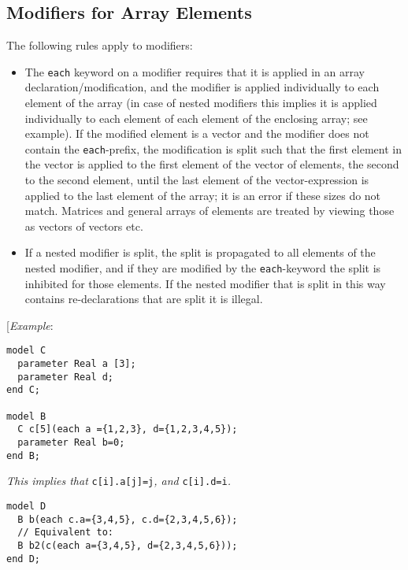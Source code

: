 \subsection{Modifiers for Array Elements}

The following rules apply to modifiers:

\begin{itemize}
\item
  The \lstinline[basicstyle=\ttfamily]!each! keyword on a modifier requires that it is applied in an array
  declaration/modification, and the modifier is applied individually to
  each element of the array (in case of nested modifiers this implies it
  is applied individually to each element of each element of the
  enclosing array; see example). If the modified element is a vector and
  the modifier does not contain the \lstinline[basicstyle=\ttfamily]!each!-prefix, the modification is
  split such that the first element in the vector is applied to the
  first element of the vector of elements, the second to the second
  element, until the last element of the vector-expression is applied to
  the last element of the array; it is an error if these sizes do not
  match. Matrices and general arrays of elements are treated by viewing
  those as vectors of vectors etc.
\item
  If a nested modifier is split, the split is propagated to all elements
  of the nested modifier, and if they are modified by the \lstinline[basicstyle=\ttfamily]!each!-keyword
  the split is inhibited for those elements. If the nested modifier that
  is split in this way contains re-declarations that are split it is
  illegal.
\end{itemize}

{[}\emph{Example}:
\begin{lstlisting}[language=modelica]
model C
  parameter Real a [3];
  parameter Real d;
end C;

model B
  C c[5](each a ={1,2,3}, d={1,2,3,4,5});
  parameter Real b=0;
end B;
\end{lstlisting}

\emph{This implies that} \lstinline[basicstyle=\ttfamily]!c[i].a[j]=j!\emph{, and}
\lstinline[basicstyle=\ttfamily]!c[i].d=i!\emph{.}
\begin{lstlisting}[language=modelica]
model D
  B b(each c.a={3,4,5}, c.d={2,3,4,5,6});
  // Equivalent to:
  B b2(c(each a={3,4,5}, d={2,3,4,5,6}));
end D;
\end{lstlisting}

